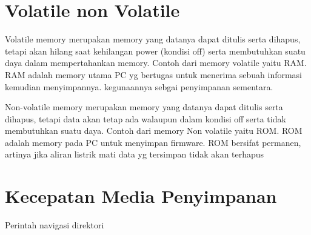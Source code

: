 \section{Volatile non Volatile}
Volatile memory merupakan memory yang datanya dapat ditulis serta dihapus, tetapi akan hilang saat kehilangan power (kondisi off) serta membutuhkan suatu daya dalam mempertahankan memory. Contoh dari memory volatile yaitu RAM. RAM adalah memory utama PC yg bertugas untuk menerima sebuah informasi kemudian menyimpannya. kegunaannya sebgai penyimpanan sementara. 


Non-volatile memory merupakan memory yang datanya dapat ditulis serta dihapus, tetapi data akan tetap ada walaupun dalam kondisi off serta tidak membutuhkan suatu daya. Contoh dari memory Non volatile yaitu ROM. ROM adalah memory pada PC untuk menyimpan firmware. ROM bersifat permanen, artinya jika aliran listrik mati data yg tersimpan tidak akan terhapus


\section{Kecepatan Media Penyimpanan}
Perintah navigasi direktori